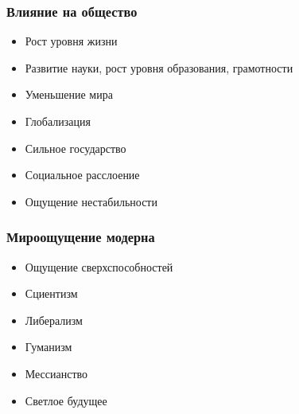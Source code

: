 \documentclass[aspectratio=169]{beamer}
\begin{document}
\begin{bframe}\frametitle{Влияние на общество}
\begin{itemize}
\item<+-> Рост уровня жизни
\item<+-> Развитие науки, рост уровня образования, грамотности
\item<+-> Уменьшение мира
\item<+-> Глобализация
\item<+-> Сильное государство
\item<+-> Социальное расслоение
\item<+-> Ощущение нестабильности
\end{itemize}
\end{bframe}

\begin{bframe}\frametitle{Мироощущение модерна}
\begin{itemize}
\item<+-> Ощущение сверхспособностей
\item<+-> Сциентизм
\item<+-> Либерализм
\item<+-> Гуманизм
\item<+-> Мессианство
\item<+-> Светлое будущее
\end{itemize}
\end{bframe}
\end{document}

